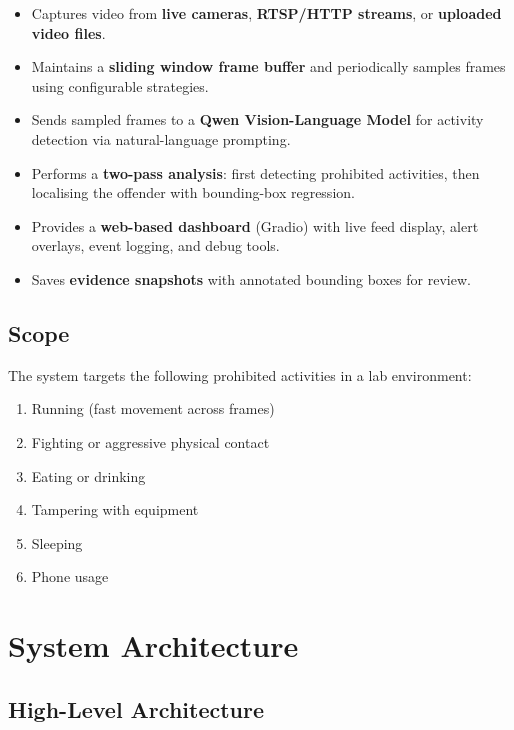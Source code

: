 \documentclass[12pt,a4paper]{article}
\begin{document}
\begin{itemize}[noitemsep]
    \item Captures video from \textbf{live cameras}, \textbf{RTSP/HTTP streams}, or \textbf{uploaded video files}.
    \item Maintains a \textbf{sliding window frame buffer} and periodically samples frames using configurable strategies.
    \item Sends sampled frames to a \textbf{Qwen Vision-Language Model} for activity detection via natural-language prompting.
    \item Performs a \textbf{two-pass analysis}: first detecting prohibited activities, then localising the offender with bounding-box regression.
    \item Provides a \textbf{web-based dashboard} (Gradio) with live feed display, alert overlays, event logging, and debug tools.
    \item Saves \textbf{evidence snapshots} with annotated bounding boxes for review.
\end{itemize}

\subsection{Scope}

The system targets the following prohibited activities in a lab environment:

\begin{enumerate}[noitemsep]
    \item Running (fast movement across frames)
    \item Fighting or aggressive physical contact
    \item Eating or drinking
    \item Tampering with equipment
    \item Sleeping
    \item Phone usage
\end{enumerate}

\section{System Architecture}

\subsection{High-Level Architecture}
\end{document}
